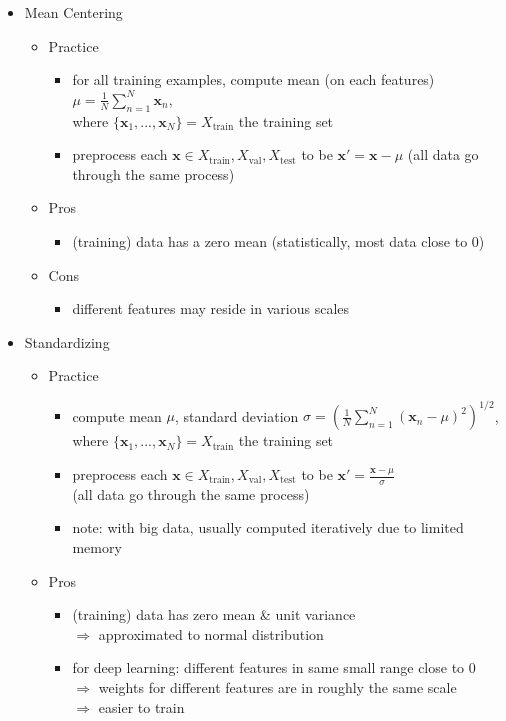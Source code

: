 \begin{itemize}
\item Mean Centering
	\begin{itemize}
	\item Practice
		\begin{itemize}
		\item for all training examples, compute mean (on each features) $\displaystyle \mu=\frac 1 N \sum_{n=1}^N{\mathbf x_n}$, \\
		where $\{\mathbf x_1,...,\mathbf x_N\}=X_\text{train}$ the training set
		\item preprocess each $\mathbf x \in X_\text{train}, X_\text{val}, X_\text{test}$ to be $\mathbf x'=\mathbf x -\mu$
		(all data go through the same process)
		\end{itemize}
	\item Pros
		\begin{itemize}
		\item (training) data has a zero mean (statistically, most data close to $0$)
		\end{itemize}
	\item Cons
		\begin{itemize}
		\item different features may reside in various scales
		\end{itemize}
	\end{itemize}
\item Standardizing
	\begin{itemize}
	\item Practice
		\begin{itemize}
		\item compute mean $\mu$, standard deviation $\displaystyle \sigma=\left( \frac 1 N \sum_{n=1}^N{(\mathbf x_n-\mu)^2} \right)^{1/2}$, \\
		where $\{\mathbf x_1,...,\mathbf x_N\}=X_\text{train}$ the training set
		\item preprocess each $\mathbf x \in X_\text{train}, X_\text{val}, X_\text{test}$ to be $\mathbf x'=\frac{\mathbf x -\mu} \sigma$ \\ 
		(all data go through the same process)
		\item note: with big data, usually computed iteratively due to limited memory
		\end{itemize}
	\item Pros
		\begin{itemize}
		\item (training) data has zero mean \& unit variance \\
		$\Rightarrow$ approximated to normal distribution
		\item for deep learning: different features in same small range close to $0$ \\
		$\Rightarrow$ weights for different features are in roughly the same scale \\
		$\Rightarrow$ easier to train
		\end{itemize}
	\end{itemize}


\end{itemize}

